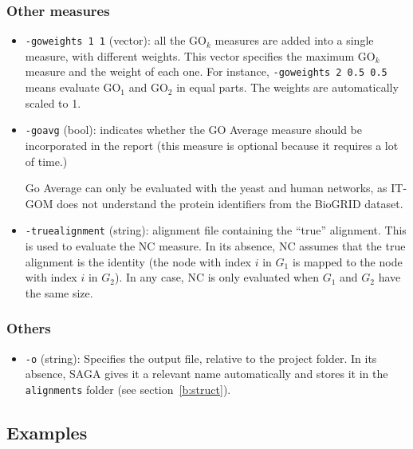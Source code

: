 \documentclass[]{article}
\begin{document}
\subsubsection*{Other measures}
\begin{itemize}
\item\texttt{-goweights 1 1} (vector): all the $\mbox{GO}_k$ measures are added into a single measure, with different weights. This vector specifies the maximum $\mbox{GO}_k$ measure and the weight of each one. For instance, \texttt{-goweights 2 0.5 0.5} means evaluate $\mbox{GO}_1$ and $\mbox{GO}_2$ in equal parts. The weights are automatically scaled to 1.
\item\texttt{-goavg} (bool): indicates whether the GO Average measure should be incorporated in the report (this measure is optional because it requires a lot of time.)

Go Average can only be evaluated with the yeast and human networks, as IT-GOM does not understand the protein identifiers from the BioGRID dataset.
\item\texttt{-truealignment} (string): alignment file containing the ``true'' alignment. This is used to evaluate the NC measure. In its absence, NC assumes that the true alignment is the identity (the node with index $i$ in $G_1$ is mapped to the node with index $i$ in $G_2$). In any case, NC is only evaluated when $G_1$ and $G_2$ have the same size.
\end{itemize}

\subsubsection*{Others}
\begin{itemize}
\item\texttt{-o} (string): Specifies the output file, relative to the project folder. In its absence, SAGA gives it a relevant name automatically and stores it in the \texttt{alignments} folder (see section~\ref{b:struct}).
\end{itemize}

\subsection{Examples}
\end{document}
